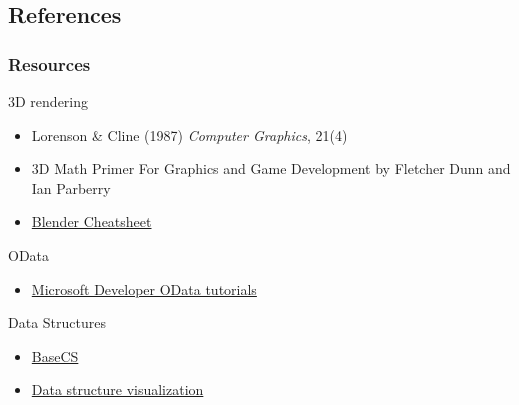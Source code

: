 \documentclass[11pt]{beamer}
\begin{document}
\subsection*{References}
\begin{frame}
	\frametitle{Resources}
	3D rendering
	\begin{itemize}
		\item Lorenson \& Cline (1987) \textit{Computer Graphics}, 21(4)
		\item 3D Math Primer For Graphics and Game Development by Fletcher Dunn and Ian Parberry
		\item \href{https://www.giudansky.com/images/articoli/2016/11/xblender-infographic-1280-SM.png.pagespeed.ic.1kzexBoDEx.png}{Blender Cheatsheet}
	\end{itemize}
	OData
	\begin{itemize}
		\item \href{https://msdn.microsoft.com/en-us/library/gg334279(v=crm.7).aspx}{Microsoft Developer OData tutorials}
	\end{itemize}
	Data Structures
	\begin{itemize}
		\item \href{https://medium.com/basecs}{BaseCS}
		\item \href{https://www.cs.usfca.edu/~galles/visualization/Algorithms.html}{Data structure visualization}
	\end{itemize}
\end{frame}
\end{document}

